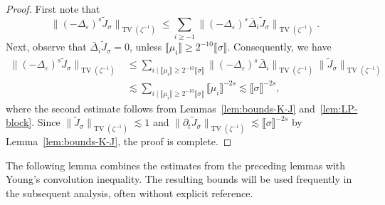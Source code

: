 \documentclass{article}
\numberwithin{equation}{section}
\theoremstyle{plain}
\theoremstyle{definition}
\begin{document}
\begin{proof}
  First note that
  \[ \| (- \Delta_{\varepsilon})^s \tilde J_{\sigma} \|_{\operatorname{TV} (\zeta^{- 1})}
     \leqslant \sum_{i \geqslant - 1} \| (- \Delta_{\varepsilon})^s
     \bar{\Delta}_i  \tilde J_{\sigma} \|_{\operatorname{TV} (\zeta^{- 1})}. \]
  Next, observe that $\bar{\Delta}_i 
  \tilde J_{\sigma} = 0$, unless $\llbracket \mu_i \rrbracket \geqslant 2^{- 10}
  \llbracket \sigma \rrbracket .$ Consequently, we have
  \begin{align*}
    \| (- \Delta_{\varepsilon})^s \tilde J_{\sigma} \|_{\operatorname{TV}(\zeta^{- 1})}
    &\leqslant
    \sum_{i\mid \llbracket \mu_i \rrbracket \geqslant 2^{-10}
    \llbracket \sigma \rrbracket}
    \| (- \Delta_{\varepsilon})^s \bar{\Delta}_i
    \|_{\operatorname{TV}(\zeta^{- 1})}
    \| \tilde J_{\sigma} \|_{\operatorname{TV}(\zeta^{- 1})}\\
    &\lesssim
    \sum_{i\mid \llbracket \mu_i \rrbracket \geqslant 2^{-10}
    \llbracket \sigma \rrbracket}
    \llbracket \mu_i \rrbracket^{- 2 s}
    \lesssim \llbracket \sigma \rrbracket^{- 2 s},
  \end{align*}
  where the second estimate follows from Lemmas~\ref{lem:bounds-K-J}
  and~\ref{lem:LP-block}. Since $\| \tilde{J}_{\sigma} \|_{\operatorname{TV} (
  	{\zeta^{-1}}  )} \lesssim 1$ and $\| \partial_t \tilde{J}_{\sigma} \|_{\operatorname{TV} (
  	{\zeta^{-1}}  )} \lesssim \llbracket \sigma \rrbracket^{- 2 s}$ by Lemma~\ref{lem:bounds-K-J}, the proof is complete.
\end{proof}

The following lemma combines the estimates from the preceding lemmas with
Young's convolution inequality. The resulting bounds will be used frequently
in the subsequent analysis, often without explicit reference.
\end{document}
